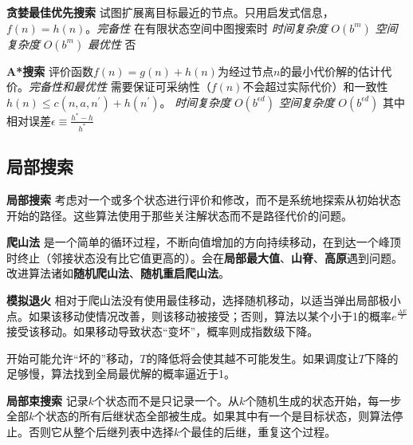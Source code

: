 \documentclass[10pt,a4paper]{ctexart}
\begin{document}
\begin{multicols}{3}
        \textbf{贪婪最佳优先搜索}
        试图扩展离目标最近的节点。只用启发式信息，$f(n)=h(n)$。\emph{完备性} 在有限状态空间中图搜索时 \emph{时间复杂度} $O(b^m)$ \emph{空间复杂度} $O(b^m)$ \emph{最优性} 否

        \textbf{A*搜索}
        评价函数$f(n)=g(n)+h(n)$为经过节点$n$的最小代价解的估计代价。\emph{完备性和最优性} 需要保证可采纳性（$f(n)$不会超过实际代价）和一致性$h(n)\leq c(n,a,n^\prime)+h(n^\prime)$。 \emph{时间复杂度} $O(b^{\epsilon d})$ \emph{空间复杂度} $O(b^{\epsilon d})$ 其中相对误差$\epsilon\equiv \frac{h^*-h}{h^*}$

        \subsection{局部搜索}
        \textbf{局部搜索}
        考虑对一个或多个状态进行评价和修改，而不是系统地探索从初始状态开始的路径。这些算法使用于那些关注解状态而不是路径代价的问题。
        
        \textbf{爬山法}
        是一个简单的循环过程，不断向值增加的方向持续移动，在到达一个峰顶时终止（邻接状态没有比它值更高的）。会在\textbf{局部最大值}、\textbf{山脊}、\textbf{高原}遇到问题。改进算法诸如\textbf{随机爬山法}、\textbf{随机重启爬山法}。

        \textbf{模拟退火}
        相对于爬山法没有使用最佳移动，选择随机移动，以适当弹出局部极小点。如果该移动使情况改善，则该移动被接受；否则，算法以某个小于1的概率$e^\frac{\Delta E}{T}$接受该移动。如果移动导致状态“变坏”，概率则成指数级下降。
        
        开始可能允许“坏的”移动，$T$的降低将会使其越不可能发生。如果调度让$T$下降的足够慢，算法找到全局最优解的概率逼近于1。

        \textbf{局部束搜索}
        记录$k$个状态而不是只记录一个。从$k$个随机生成的状态开始，每一步全部$k$个状态的所有后继状态全部被生成。如果其中有一个是目标状态，则算法停止。否则它从整个后继列表中选择$k$个最佳的后继，重复这个过程。
        

\end{multicols}
\end{document}
